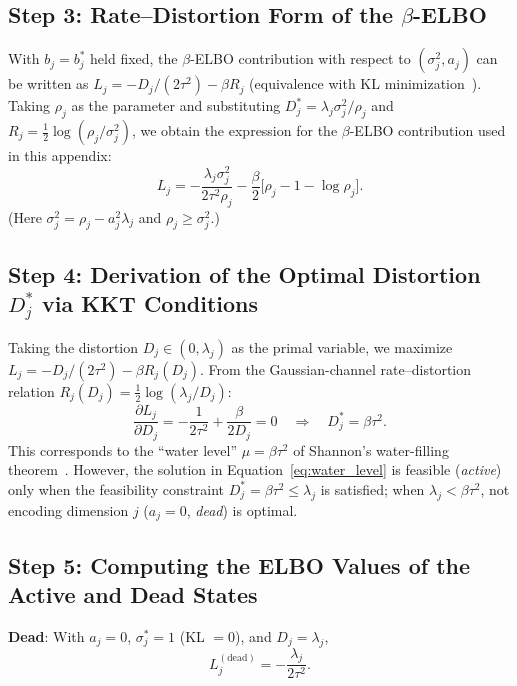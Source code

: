 \documentclass[make,article,submit,pdftex,moreauthors]{Definitions/mdpi}
\begin{document}
\subsection*{Step 3: Rate--Distortion Form of the $\beta$-ELBO}

With $b_j = b_j^*$ held fixed, the $\beta$-ELBO contribution with respect to
$(\sigma_j^2, a_j)$ can be written as
$L_j = -D_j/(2\tau^2) - \beta R_j$ (equivalence with KL
minimization~\cite{cover2006elements}).
Taking $\rho_j$ as the parameter and substituting
$D_j^* = \lambda_j \sigma_j^2/\rho_j$ and
$R_j = \tfrac{1}{2}\log(\rho_j/\sigma_j^2)$,
we obtain the expression for the $\beta$-ELBO contribution used in this appendix:
\begin{equation}
  L_j = -\frac{\lambda_j \sigma_j^2}{2\tau^2 \rho_j}
        - \frac{\beta}{2}\bigl[\rho_j - 1 - \log \rho_j\bigr].
  \label{eq:elbo_j}
\end{equation}
(Here $\sigma_j^2 = \rho_j - a_j^2\lambda_j$ and $\rho_j \geq \sigma_j^2$.)

\subsection*{Step 4: Derivation of the Optimal Distortion $D_j^*$ via KKT Conditions}

Taking the distortion $D_j \in (0, \lambda_j)$ as the primal variable, we maximize
$L_j = -D_j/(2\tau^2) - \beta R_j(D_j)$.
From the Gaussian-channel rate--distortion relation
$R_j(D_j) = \tfrac{1}{2}\log(\lambda_j / D_j)$:
\begin{equation}
  \frac{\partial L_j}{\partial D_j}
  = -\frac{1}{2\tau^2} + \frac{\beta}{2 D_j} = 0
  \quad\Longrightarrow\quad
  D_j^{*} = \beta \tau^2.
  \label{eq:water_level}
\end{equation}
This corresponds to the ``water level'' $\mu = \beta\tau^2$ of Shannon's
water-filling theorem~\cite{cover2006elements}.
However, the solution in Equation~\eqref{eq:water_level} is feasible
(\textit{active}) only when the feasibility constraint
$D_j^* = \beta\tau^2 \leq \lambda_j$ is satisfied; when
$\lambda_j < \beta\tau^2$, not encoding dimension $j$
($a_j = 0$, \textit{dead}) is optimal.

\subsection*{Step 5: Computing the ELBO Values of the Active and Dead States}

\textbf{Dead}: With $a_j = 0$, $\sigma_j^* = 1$ (KL $= 0$), and $D_j = \lambda_j$,
\begin{equation}
  L_j^{(\mathrm{dead})} = -\frac{\lambda_j}{2\tau^2}.
  \label{eq:Lj_dead}
\end{equation}
\end{document}
